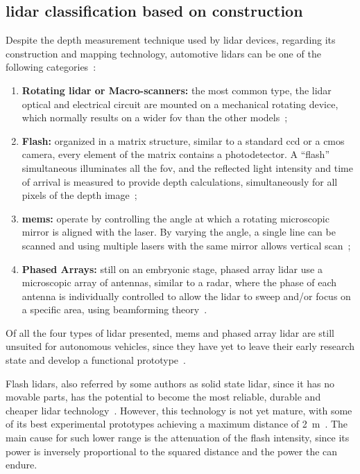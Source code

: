 \subsection{\ac{lidar} classification based on construction}
Despite the depth measurement technique used by \ac{lidar} devices, regarding its construction and mapping technology, automotive \acp{lidar} can be one of the following categories~\cite{Hecht2018, Sullivan2016}:

\begin{enumerate}
	\item \textbf{Rotating \ac{lidar} or Macro-scanners:} the most common type, the \ac{lidar} optical and electrical circuit are mounted on a mechanical rotating device, which normally results on a wider \ac{fov} than the other models~\cite{Sullivan2016};
	\item \textbf{Flash:} organized in a matrix structure, similar to a standard \ac{ccd} or a \ac{cmos} camera, every element of the matrix contains a photodetector. A ``flash'' simultaneous illuminates all the \ac{fov}, and the reflected light intensity and time of arrival is measured to provide depth calculations, simultaneously for all pixels of the depth image~\cite{TetraVue, Ouster, Gelbart2002,Stettner2010, Simpson2019}; 
	\item \textbf{\ac{mems}:} operate by controlling the angle at which a rotating microscopic mirror is aligned with the \ac{laser}. By varying the angle, a single line can be scanned and using multiple \acp{laser} with the same mirror allows vertical scan~\cite{LeddarTech, Yoo2018};
	\item \textbf{Phased Arrays:} still on an embryonic stage, phased array \ac{lidar} use a microscopic array of antennas, similar to a \ac{radar}, where the phase of each antenna is individually controlled to allow the \ac{lidar} to sweep and/or focus on a specific area, using beamforming theory~\cite{Quanergy2018, Yu2016}.
\end{enumerate}

Of all the four types of \ac{lidar} presented, \ac{mems} and phased array \ac{lidar} are still unsuited for autonomous vehicles, since they have yet to leave their early research state and develop a functional prototype~\cite{Sullivan2016, Hecht2018}. 

Flash \acp{lidar}, also referred by some authors as solid state \ac{lidar}, since it has no movable parts, has the potential to become the most reliable, durable and cheaper \ac{lidar} technology~\cite{Sullivan2016, Hecht2018, Fersch2017a}. However, this technology is not yet mature, with some of its best experimental  prototypes achieving a maximum distance of \SI{2}{\meter}~\cite{Hecht2018}. The main cause for such lower range is the attenuation of the flash intensity, since its power is inversely proportional to the squared distance and the power the can endure.

